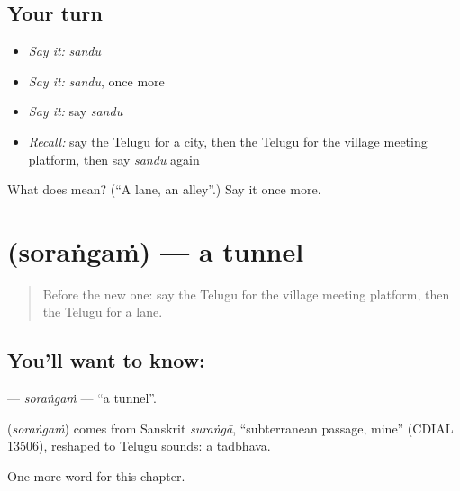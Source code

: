 \subsection*{Your turn}
\begin{itemize}
\raggedright
  \item \emph{Say it:} \emph{sandu}
  \item \emph{Say it:} \emph{sandu}, once more
  \item \emph{Say it:} say \emph{sandu}
  \item \emph{Recall:} say the Telugu for a city, then the Telugu for the village meeting platform, then say \emph{sandu} again
\end{itemize}

\begin{tcolorbox}[breakable,colback=teal!4,colframe=teal!35!black,title={Before you move on}]
What does  mean? (\textquotedblleft{}A lane, an alley\textquotedblright{}.) Say it once more.
\end{tcolorbox}
\section[\texorpdfstring{\te{సొరంగం} (soraṅgaṁ)}{సొరంగం (soraṅgaṁ)}]{ (soraṅgaṁ) — a tunnel}

\label{lesson:TE-C256-sorangam}



\begin{quote}
Before the new one: say the Telugu for the village meeting platform, then the Telugu for a lane.
\end{quote}

\subsection*{You'll want to know: }
\textbf{} — \emph{soraṅgaṁ} — \textquotedblleft{}a tunnel\textquotedblright{}.

\begin{cousinweb}
\textbf{} (\emph{soraṅgaṁ}) comes from Sanskrit \emph{suraṅgā}, \textquotedblleft{}subterranean passage, mine\textquotedblright{} (CDIAL 13506), reshaped to Telugu sounds: a tadbhava.
\end{cousinweb}

\begin{grammarlens}[title={What you've built}]
One more word for this chapter.
\end{grammarlens}

